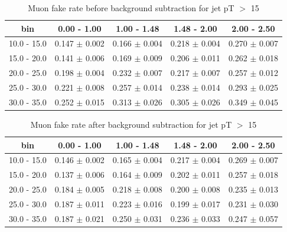\begin{table}[!ht]
{\small
\begin{center}
\begin{tabular}{c|c|c|c|c}
\hline
bin &  0.00 - 1.00  &   1.00 - 1.48  &   1.48 - 2.00  &   2.00 - 2.50 \\
\hline
  10.0 - 15.0  &    0.147 $\pm$ 0.002 &     0.166 $\pm$ 0.004 &     0.218 $\pm$ 0.004 &     0.270 $\pm$ 0.007 \\
  15.0 - 20.0  &    0.141 $\pm$ 0.006 &     0.169 $\pm$ 0.009 &     0.206 $\pm$ 0.011 &     0.262 $\pm$ 0.018 \\
  20.0 - 25.0  &    0.198 $\pm$ 0.004 &     0.232 $\pm$ 0.007 &     0.217 $\pm$ 0.007 &     0.257 $\pm$ 0.012 \\
  25.0 - 30.0  &    0.221 $\pm$ 0.008 &     0.257 $\pm$ 0.014 &     0.238 $\pm$ 0.014 &     0.293 $\pm$ 0.025 \\
  30.0 - 35.0  &    0.252 $\pm$ 0.015 &     0.313 $\pm$ 0.026 &     0.305 $\pm$ 0.026 &     0.349 $\pm$ 0.045 \\
\hline
\end{tabular}
\caption{Muon fake rate before background subtraction for jet pT $>$ 15}
\label{tab:mufake_raw}
\end{center}}
\end{table}
\begin{table}[!ht]
{\small
\begin{center}
\begin{tabular}{c|c|c|c|c}
\hline
bin &  0.00 - 1.00  &   1.00 - 1.48  &   1.48 - 2.00  &   2.00 - 2.50 \\
\hline
  10.0 - 15.0  &    0.146 $\pm$ 0.002 &     0.165 $\pm$ 0.004 &     0.217 $\pm$ 0.004 &     0.269 $\pm$ 0.007 \\
  15.0 - 20.0  &    0.137 $\pm$ 0.006 &     0.164 $\pm$ 0.009 &     0.202 $\pm$ 0.011 &     0.257 $\pm$ 0.018 \\
  20.0 - 25.0  &    0.184 $\pm$ 0.005 &     0.218 $\pm$ 0.008 &     0.200 $\pm$ 0.008 &     0.235 $\pm$ 0.013 \\
  25.0 - 30.0  &    0.187 $\pm$ 0.011 &     0.223 $\pm$ 0.016 &     0.199 $\pm$ 0.017 &     0.231 $\pm$ 0.030 \\
  30.0 - 35.0  &    0.187 $\pm$ 0.021 &     0.250 $\pm$ 0.031 &     0.236 $\pm$ 0.033 &     0.247 $\pm$ 0.057 \\
\hline
\end{tabular}
\caption{Muon fake rate after background subtraction for jet pT $>$ 15}
\label{tab:mufake_cor}
\end{center}}
\end{table}

